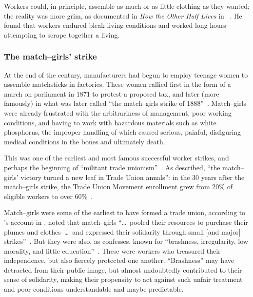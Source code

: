 \documentclass[trackingWork]{subfiles}
\begin{document}
Workers could, in principle, assemble as much or as little clothing as they wanted;
the reality was more grim, as
\citeauthor{riisOtherSideLives} documented in \textit{How the Other Half Lives} in \citeyear{riisOtherSideLives}~\cite{riisOtherSideLives}.
He found that
workers endured bleak living conditions and
worked long hours attempting to scrape together a living.


\subsubsection{The match--girls' strike}

At the end of the  century,
manufacturers had begun to employ teenage women to assemble matchsticks in factories.
These women rallied first in the form of a march on parliament in 1871 to protest a proposed tax, and 
later (more famously) in what was later called ``the match--girls strike of 1888''~\cite{10.2307/3827491}.
Match--girls were already frustrated with
the arbitrariness of management,
poor working conditions, and
having to work with hazardous materials such as white phosphorus, the improper handling of which
caused serious, painful, disfiguring medical conditions in the bones and ultimately death.

This was one of the earliest and most famous successful worker strikes,
and perhaps the beginning of ``militant trade unionism''~\cite{10.2307/3827491}.
As \citeauthor{weyer1894history} described,
``the match--girls' victory turned a new leaf in Trade Union annals'': in the 30 years after the match--girls strike,
the Trade Union Movement enrollment grew from 20\% of eligible workers to over 60\%~\cite{weyer1894history}.

Match--girls were some of the earliest to have formed a trade union,
according to \citeauthor{booth1903life}'s account in \citeyear{booth1903life}. %
\citeauthor{10.2307/3827491} noted that match--girls
``\dots~pooled their resources to purchase their plumes and clothes~\dots~and expressed their solidarity through small [and major] strikes''~\cite{booth1903life}.
But they were also, as \citeauthor{10.2307/3827491} confesses, known for ``brashness, irregularity, low morality, and little education''~\cite{10.2307/3827491}.
These were workers who treasured their independence, but also fiercely protected one another. %
``Brashness'' may have detracted from their public image, but almost undoubtedly contributed to their sense of solidarity,
making their propensity to act against such unfair treatment and poor conditions understandable and maybe predictable.
\end{document}
